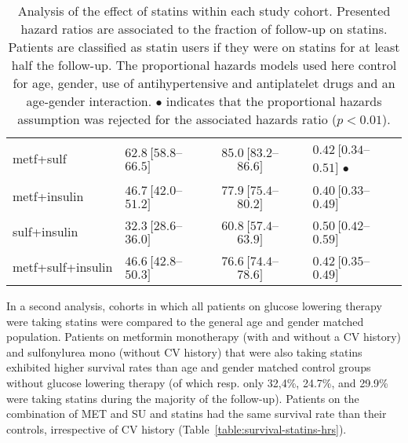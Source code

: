 \begin{table}[!h]
\begin{tabular}{llcll}
metf+sulf               & $62.8\ [58.8$--$66.5]$ & $85.0\ [83.2$--$86.6]$ & & $0.42\ [0.34$--$0.51]$ $\bullet$ \\ %
metf+insulin            & $46.7\ [42.0$--$51.2]$ & $77.9\ [75.4$--$80.2]$ & & $0.40\ [0.33$--$0.49]$ \\ %
sulf+insulin            & $32.3\ [28.6$--$36.0]$ & $60.8\ [57.4$--$63.9]$ & & $0.50\ [0.42$--$0.59]$ \\ %
metf+sulf+insulin       & $46.6\ [42.8$--$50.3]$ & $76.6\ [74.4$--$78.6]$ & & $0.42\ [0.35$--$0.49]$ \\ %
\bottomrule
\end{tabular}
\caption{Analysis of the effect of statins within each study cohort. Presented hazard ratios are associated to the fraction of follow-up on statins. Patients are classified as statin users if they were on statins for at least half the follow-up. The proportional hazards models used here control for age, gender, use of antihypertensive and antiplatelet drugs and an age-gender interaction. $\bullet$ indicates that the proportional hazards assumption was rejected for the associated hazards ratio ($p<0.01$).} \label{table:survival-statins} %
\end{table}

In a second analysis, cohorts in which all patients on glucose lowering therapy were taking statins were compared to the general age and gender matched population. Patients on metformin monotherapy (with and without a CV history) and sulfonylurea mono (without CV history) that were also taking statins exhibited higher survival rates than age and gender matched control groups without glucose lowering therapy  (of which resp. only 32,4\%, 24.7\%, and 29.9\% were taking statins during the majority of the follow-up). Patients on the combination of MET and SU and statins had the same survival rate than their controls, irrespective of CV history (Table~\ref{table:survival-statins-hrs}).
 
